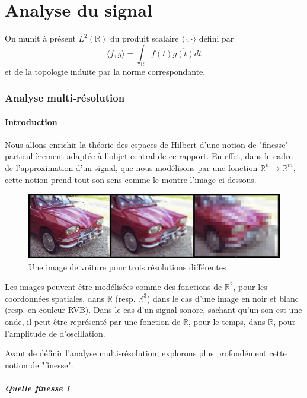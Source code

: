 	\part{Analyse du signal}
	
	On munit à présent $L^2(\mathbb{R})$ du produit scalaire $\langle \cdot, \cdot \rangle$ défini par $$\langle f, g\rangle = \int_\mathbb{R} f(t) \overline{g(t)} dt$$
	et de la topologie induite par la norme correspondante.
	
	\section{Analyse multi-résolution}
	
	\subsection{Introduction}
	
	Nous allons enrichir la théorie des espaces de Hilbert d'une notion de "finesse"  particulièrement adaptée à l'objet central de ce rapport. En effet, dans le cadre de l'approximation d'un signal, que nous modélisons par une fonction $\mathbb{R}^n \rightarrow \mathbb{R}^m$, cette notion prend tout son sens comme le montre l'image ci-dessous.
	
	\begin{figure}[h]
		\centering
		\includegraphics[width=350pt]{Pierre/Resolution_wikipedia.jpg}
		\caption{Une image de voiture pour trois résolutions différentes}
	\end{figure}
	
	Les images peuvent être modélisées comme des fonctions de $\mathbb{R}^2$, pour les coordonnées spatiales, dans $\mathbb{R}$ (resp. $\mathbb{R}^3$) dans le cas d'une image en noir et blanc (resp. en couleur RVB). Dans le cas d'un signal sonore, sachant qu'un son est une onde, il peut être représenté par une fonction de $\mathbb{R}$, pour le temps, dans $\mathbb{R}$, pour l'amplitude de d'oscillation.
	
	Avant de définir l'analyse multi-résolution, explorons plus profondément cette notion de "finesse".
	
	\subsubsection*{Quelle finesse !}
	

